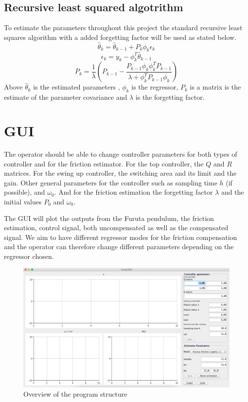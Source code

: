 \documentclass[10pt,a4paper]{article}
\begin{document}
\subsection{Recursive least squared algotrithm}
\label{subsec:rlsalg}
To estimate the parameters throughout this project the standard recursive least squares algorithm with a added forgetting factor will be used as stated below. 
\begin{equation}
\hat{\theta}_k = \hat{\theta}_{k-1}+P_k\phi_k\epsilon_k 
\end{equation}
\begin{equation}
\epsilon_k=y_k-\phi_k^{T}\hat{\theta}_{k-1} 
\end{equation}
\begin{equation}
P_k=\frac{1}{\lambda}(P_{k-1}-\frac{P_{k-1}\phi_k\phi_k^{T}P_{k-1}}{\lambda+\phi_k^{T}P_{k-1}\phi_k})
\end{equation}
Above $\hat{\theta}_k$ is the estimated parameters , $\phi_k$ is the regressor, $P_k$ is a matrix is the estimate of the parameter covariance and $\lambda$ is the forgetting factor.

\section{GUI}
The operator should be able to change controller parameters for both types of controller and for the friction estimator. For the top controller, the $Q$ and $R$ matrices. For the swing up controller, the switching area and its limit and the gain. Other general parameters for the controller such as sampling time $h$ (if possible), and $\omega _0$. And for the friction estimation the forgetting factor $\lambda$ and the initial values $P_0$ and $\omega _0$.

The GUI will plot the outputs from the Furuta pendulum, the friction estimation, control signal, both uncompensated as well as the compensated signal. We aim to have different regressor modes for the friction compensation and the operator can therefore change different parameters depending on the regressor chosen. 

\begin{figure}[!htb]
\begin{center}
\includegraphics[width=1\textwidth]{gui.png}
\caption{Overview of the program structure}
\label{fig:gui}
\end{center}
\end{figure}
\end{document}
